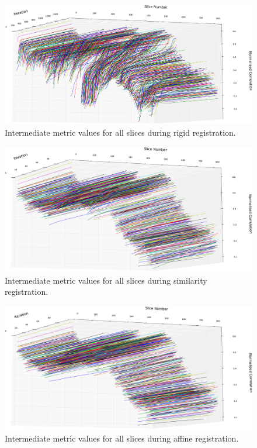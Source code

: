   \begin{figure}
    \centering
    \includegraphics[width=\textheight]{Ch5/Figs/diagnostics/rigid_metric_values}
    \caption{Intermediate metric values for all slices during rigid registration.}
    \label{fig:rigid_metric_values}
  \end{figure}
      
  \begin{figure}
    \centering
    \includegraphics[width=\textheight]{Ch5/Figs/diagnostics/similarity_metric_values}
    \caption{Intermediate metric values for all slices during similarity registration.}
    \label{fig:similarity_metric_values}
  \end{figure}
      
  \begin{figure}
    \centering
    \includegraphics[width=\textheight]{Ch5/Figs/diagnostics/affine_metric_values}
    \caption{Intermediate metric values for all slices during affine registration.}
    \label{fig:affine_metric_values}
  \end{figure}
  
